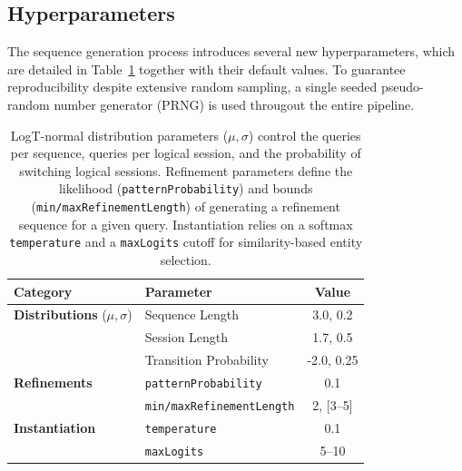 \subsection{Hyperparameters}

The sequence generation process introduces several new hyperparameters, 
which are detailed in Table~\ref{tab:generation_hyperparameters} together with their default values. 
To guarantee reproducibility despite extensive random sampling, 
a single seeded pseudo-random number generator (PRNG) is used througout the 
entire pipeline.

\begin{table}[htbp]
    \centering
    \caption{LogT-normal distribution parameters ($\mu, \sigma$) control the queries per sequence, 
    queries per logical session, and the probability of switching logical sessions. 
    Refinement parameters define the likelihood (\texttt{patternProbability}) 
    and bounds (\texttt{min/maxRefinementLength}) of generating a refinement sequence for a given query. 
    Instantiation relies on a softmax \texttt{temperature} and a \texttt{maxLogits} 
    cutoff for similarity-based entity selection.}
    \label{tab:generation_hyperparameters}
    \begin{tabular}{l l c}
        \toprule
        \textbf{Category} & \textbf{Parameter} & \textbf{Value} \\
        \midrule
        \textbf{Distributions} ($\mu, \sigma$) 
        & Sequence Length & 3.0, 0.2 \\
        & Session Length & 1.7, 0.5 \\
        & Transition Probability & -2.0, 0.25 \\
        \addlinespace
        \textbf{Refinements} 
        & \texttt{patternProbability} & 0.1 \\
        & \texttt{min/maxRefinementLength} & 2, [3--5] \\
        \addlinespace
        \textbf{Instantiation} 
        & \texttt{temperature} & 0.1 \\
        & \texttt{maxLogits} & 5--10 \\
        \bottomrule
    \end{tabular}
\end{table}
